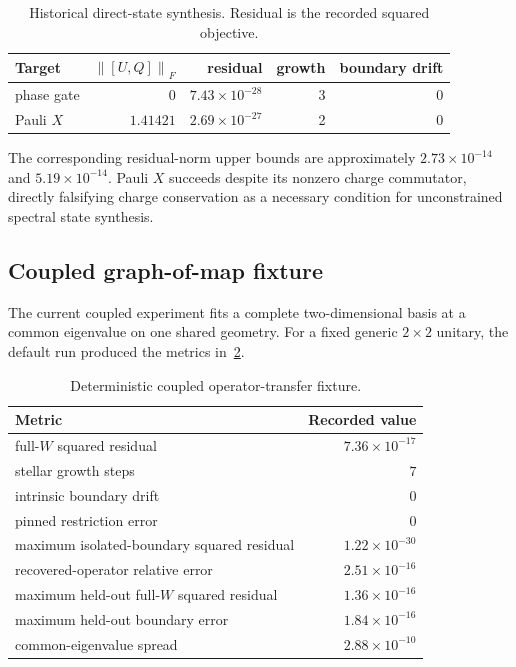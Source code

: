 \documentclass[11pt]{article}
\numberwithin{equation}{section}
\theoremstyle{definition}
\theoremstyle{remark}
\newcommand{\norm}[1]{\left\lVert #1\right\rVert}
\begin{document}
\begin{table}[htbp]
  \centering
  \caption{Historical direct-state synthesis.  Residual is the recorded
  squared objective.}
  \label{tab:historical}
  \begin{tabular}{lrrrr}
    \toprule
    Target & $\norm{[U,Q]}_F$ & residual & growth & boundary drift\\
    \midrule
    phase gate & $0$ & $7.43\times10^{-28}$ & 3 & $0$\\
    Pauli $X$ & $1.41421$ & $2.69\times10^{-27}$ & 2 & $0$\\
    \bottomrule
  \end{tabular}
\end{table}

The corresponding residual-norm upper bounds are approximately
$2.73\times10^{-14}$ and $5.19\times10^{-14}$.  Pauli $X$ succeeds despite its
nonzero charge commutator, directly falsifying charge conservation as a
necessary condition for unconstrained spectral state synthesis.

\subsection{Coupled graph-of-map fixture}

The current coupled experiment fits a complete two-dimensional basis at a
common eigenvalue on one shared geometry.  For a fixed generic $2\times2$
unitary, the default run produced the metrics in~\cref{tab:coupled}.

\begin{table}[htbp]
  \centering
  \caption{Deterministic coupled operator-transfer fixture.}
  \label{tab:coupled}
  \begin{tabular}{lr}
    \toprule
    Metric & Recorded value\\
    \midrule
    full-$W$ squared residual & $7.36\times10^{-17}$\\
    stellar growth steps & $7$\\
    intrinsic boundary drift & $0$\\
    pinned restriction error & $0$\\
    maximum isolated-boundary squared residual & $1.22\times10^{-30}$\\
    recovered-operator relative error & $2.51\times10^{-16}$\\
    maximum held-out full-$W$ squared residual & $1.36\times10^{-16}$\\
    maximum held-out boundary error & $1.84\times10^{-16}$\\
    common-eigenvalue spread & $2.88\times10^{-10}$\\
    \bottomrule
  \end{tabular}
\end{table}
\end{document}
